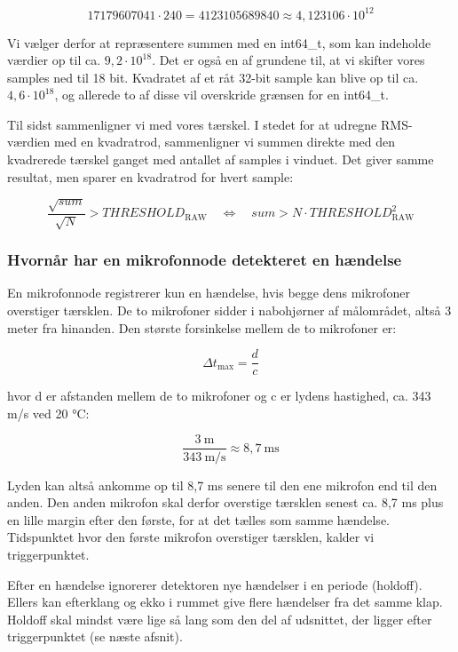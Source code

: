 \documentclass[
  danish,
]{article}
\begin{document}
\[17179607041 \cdot 240 = 4123105689840 \approx 4{,}123106 \cdot 10^{12}\]

Vi vælger derfor at repræsentere summen med en int64\_t, som kan
indeholde værdier op til ca. \(9{,}2 \cdot 10^{18}\). Det er også en af grundene til,
at vi skifter vores samples ned til 18 bit. Kvadratet af et råt 32-bit
sample kan blive op til ca. \(4{,}6 \cdot 10^{18}\), og allerede to af disse vil
overskride grænsen for en int64\_t.

Til sidst sammenligner vi med vores tærskel. I stedet for at udregne
RMS-værdien med en kvadratrod, sammenligner vi summen direkte med den
kvadrerede tærskel ganget med antallet af samples i vinduet. Det giver
samme resultat, men sparer en kvadratrod for hvert sample:

\[\frac{\sqrt{\mathit{sum}}}{\sqrt{N}} > \mathit{THRESHOLD}_{\mathrm{RAW}} \quad \Longleftrightarrow \quad \mathit{sum} > N \cdot \mathit{THRESHOLD}_{\mathrm{RAW}}^{2}\]

\subsubsection{Hvornår har en mikrofonnode detekteret en
hændelse}\label{hvornuxe5r-har-en-mikrofonnode-detekteret-en-huxe6ndelse}

En mikrofonnode registrerer kun en hændelse, hvis begge dens mikrofoner
overstiger tærsklen. De to mikrofoner sidder i nabohjørner af
målområdet, altså 3 meter fra hinanden. Den største forsinkelse mellem
de to mikrofoner er:

\[\Delta t_{\max} = \frac{d}{c}\]

hvor d er afstanden mellem de to mikrofoner og c er lydens hastighed,
ca. 343 m/s ved 20 °C:

\[\frac{3\ \mathrm{m}}{343\ \mathrm{m/s}} \approx 8{,}7\ \mathrm{ms}\]

Lyden kan altså ankomme op til 8,7 ms senere til den ene mikrofon end
til den anden. Den anden mikrofon skal derfor overstige tærsklen senest
ca. 8,7 ms plus en lille margin efter den første, for at det tælles som
samme hændelse. Tidspunktet hvor den første mikrofon overstiger
tærsklen, kalder vi triggerpunktet.

Efter en hændelse ignorerer detektoren nye hændelser i en periode
(holdoff). Ellers kan efterklang og ekko i rummet give flere hændelser
fra det samme klap. Holdoff skal mindst være lige så lang som den del af
udsnittet, der ligger efter triggerpunktet (se næste afsnit).
\end{document}
